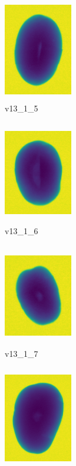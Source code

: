 \documentclass[11pt]{article}
\begin{document}
\begin{figure}
    
         \begin{subfigure}[b]{0.15\textwidth}
         \centering
         \includegraphics[width=3cm, height=4.5cm]{images/kartofler/v13_1_5_cut.png}
         \caption{v13\_1\_5}
         \label{fig:y equals x}
     \end{subfigure}
     \hfill
     \begin{subfigure}[b]{0.15\textwidth}
         \centering
         \includegraphics[width=3cm, height=4.5cm]{images/kartofler/v13_1_6_cut.png}
        \caption{v13\_1\_6}
         \label{fig:three sin x}
     \end{subfigure}
     \hfill
     \begin{subfigure}[b]{0.15\textwidth}
         \centering
         \includegraphics[width=3cm, height=4.5cm]{images/kartofler/v13_1_7_cut.png}
        \caption{v13\_1\_7}
         \label{fig:five over x}
     \end{subfigure}
     \hfill
    \begin{subfigure}[b]{0.15\textwidth}
         \centering
         \includegraphics[width=3cm, height=4.5cm]{images/kartofler/v13_1_8_cut.png}

\end{subfigure}
\end{figure}
\end{document}
